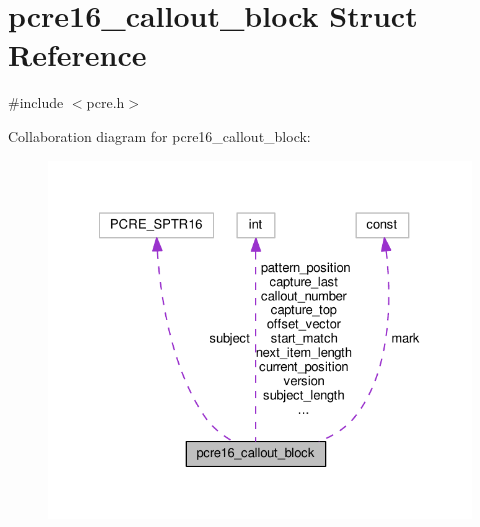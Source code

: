 \hypertarget{structpcre16__callout__block}{}\section{pcre16\+\_\+callout\+\_\+block Struct Reference}
\label{structpcre16__callout__block}


{\ttfamily \#include $<$pcre.\+h$>$}



Collaboration diagram for pcre16\+\_\+callout\+\_\+block\+:
\nopagebreak
\begin{figure}[H]
\begin{center}
\leavevmode
\includegraphics[width=328pt]{structpcre16__callout__block__coll__graph}
\end{center}
\end{figure}
